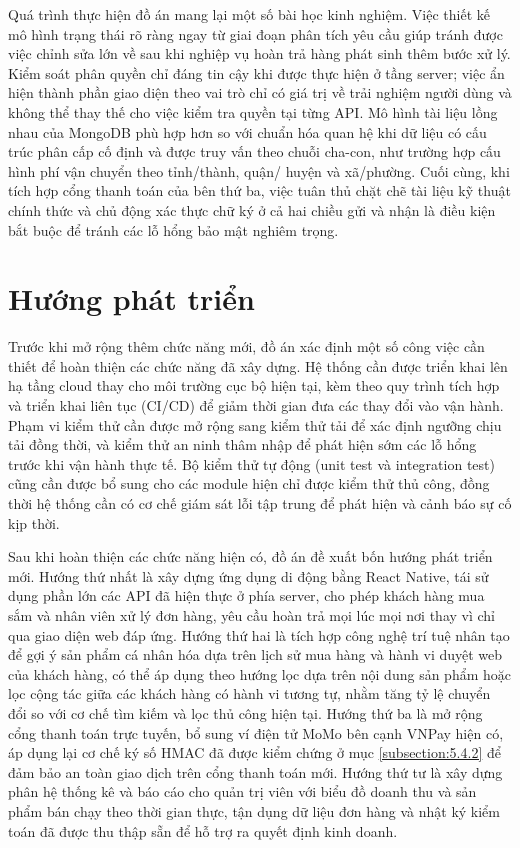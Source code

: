 \documentclass[../DoAn.tex]{subfiles}
\begin{document}
Quá trình thực hiện đồ án mang lại một số bài học kinh nghiệm. Việc thiết kế
mô hình trạng thái rõ ràng ngay từ giai đoạn phân tích yêu cầu giúp tránh
được việc chỉnh sửa lớn về sau khi nghiệp vụ hoàn trả hàng phát sinh thêm
bước xử lý. Kiểm soát phân quyền chỉ đáng tin cậy khi được thực hiện ở tầng
server; việc ẩn hiện thành phần giao diện theo vai trò chỉ có giá trị về
trải nghiệm người dùng và không thể thay thế cho việc kiểm tra quyền tại
từng API. Mô hình tài liệu lồng nhau của MongoDB phù hợp hơn so với chuẩn
hóa quan hệ khi dữ liệu có cấu trúc phân cấp cố định và được truy vấn theo
chuỗi cha-con, như trường hợp cấu hình phí vận chuyển theo tỉnh/thành, quận/
huyện và xã/phường. Cuối cùng, khi tích hợp cổng thanh toán của bên thứ ba,
việc tuân thủ chặt chẽ tài liệu kỹ thuật chính thức và chủ động xác thực chữ
ký ở cả hai chiều gửi và nhận là điều kiện bắt buộc để tránh các lỗ hổng bảo
mật nghiêm trọng.

\section{Hướng phát triển}
\label{section:6.2}

Trước khi mở rộng thêm chức năng mới, đồ án xác định một số công việc cần
thiết để hoàn thiện các chức năng đã xây dựng. Hệ thống cần được triển khai
lên hạ tầng cloud thay cho môi trường cục bộ hiện tại, kèm theo quy trình
tích hợp và triển khai liên tục (CI/CD) để giảm thời gian đưa các thay đổi
vào vận hành. Phạm vi kiểm thử cần được mở rộng sang kiểm thử tải để xác định
ngưỡng chịu tải đồng thời, và kiểm thử an ninh thâm nhập để phát hiện sớm các
lỗ hổng trước khi vận hành thực tế. Bộ kiểm thử tự động (unit test và
integration test) cũng cần được bổ sung cho các module hiện chỉ được kiểm
thử thủ công, đồng thời hệ thống cần có cơ chế giám sát lỗi tập trung để phát
hiện và cảnh báo sự cố kịp thời.

Sau khi hoàn thiện các chức năng hiện có, đồ án đề xuất bốn hướng phát triển
mới. Hướng thứ nhất là xây dựng ứng dụng di động bằng React Native, tái sử
dụng phần lớn các API đã hiện thực ở phía server, cho phép khách hàng mua
sắm và nhân viên xử lý đơn hàng, yêu cầu hoàn trả mọi lúc mọi nơi thay vì chỉ
qua giao diện web đáp ứng. Hướng thứ hai là tích hợp công nghệ trí tuệ nhân
tạo để gợi ý sản phẩm cá nhân hóa dựa trên lịch sử mua hàng và hành vi duyệt
web của khách hàng, có thể áp dụng theo hướng lọc dựa trên nội dung sản phẩm
hoặc lọc cộng tác giữa các khách hàng có hành vi tương tự, nhằm tăng tỷ lệ
chuyển đổi so với cơ chế tìm kiếm và lọc thủ công hiện tại. Hướng thứ ba là
mở rộng cổng thanh toán trực tuyến, bổ sung ví điện tử MoMo bên cạnh VNPay
hiện có, áp dụng lại cơ chế ký số HMAC đã được kiểm chứng ở mục
\ref{subsection:5.4.2} để đảm bảo an toàn giao dịch trên cổng thanh toán mới.
Hướng thứ tư là xây dựng phân hệ thống kê và báo cáo cho quản trị viên với
biểu đồ doanh thu và sản phẩm bán chạy theo thời gian thực, tận dụng dữ liệu
đơn hàng và nhật ký kiểm toán đã được thu thập sẵn để hỗ trợ ra quyết định
kinh doanh.
\end{document}
